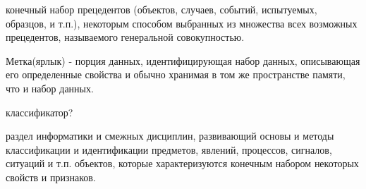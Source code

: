 \Defines %
\begin{description}
	
	\item[Выборка/выборка данных]  конечный набор прецедентов (объектов, случаев, событий, испытуемых, образцов, и т.п.), некоторым способом выбранных из множества всех возможных прецедентов, называемого генеральной совокупностью\cite{def01}.
	\item Метка(ярлык)  - порция данных, идентифицирующая набор данных, описывающая его определенные свойства и обычно хранимая в том же пространстве памяти, что и набор данных\cite{def02}.
	
	классификатор?
	\item[Теория распознавания образа] раздел информатики и смежных дисциплин, развивающий основы и методы классификации и идентификации предметов, явлений, процессов, сигналов, ситуаций и т.п. объектов, которые характеризуются конечным набором некоторых свойств и признаков.
\end{description}

